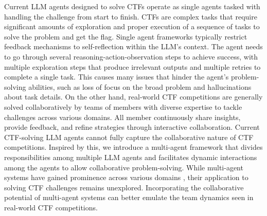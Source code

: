 Current LLM agents designed to solve CTFs operate as single agents tasked with handling the challenge from start to finish.
CTFs are complex tasks that require significant amounts of exploration and proper execution of a sequence of tasks to solve the problem and get the flag.
Single agent frameworks typically restrict feedback mechanisms to self-reflection within the LLM’s context. The agent needs to go through several reasoning-action-observation steps to achieve success, with multiple exploration steps that produce irrelevant outputs and multiple retries to complete a single task.
This causes many issues that hinder the agent's problem-solving abilities, such as loss of focus on the broad problem and hallucinations about task details.
On the other hand, real-world CTF competitions are generally solved collaboratively by teams \cite{chang2022capture, cuevas2022observations} of members with diverse expertise to tackle challenges across various domains. All member continuously share insights, provide feedback, and refine strategies through interactive collaboration. 
Current CTF-solving LLM agents cannot fully capture the collaborative nature of CTF competitions.
Inspired by this, we introduce a multi-agent framework that divides responsibilities among multiple LLM agents and facilitates dynamic interactions among the agents to allow collaborative problem-solving.
While multi-agent systems have gained prominence across various domains \cite{dorri2018multi, li2024more, xu2023rewoo}, their application to solving CTF challenges remains unexplored.  Incorporating the collaborative potential of multi-agent systems can better emulate the team dynamics seen in real-world CTF competitions.




